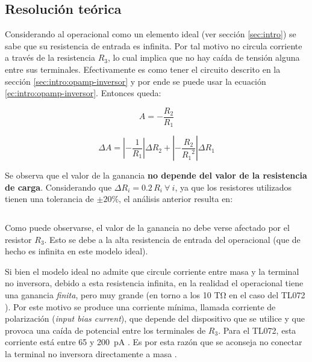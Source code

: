 \subsection{Resolución teórica}
\label{sec:1-teoria}

Considerando al operacional como un elemento ideal (ver sección \ref{sec:intro})
se sabe que su resistencia de entrada es infinita. Por tal motivo no circula
corriente a través de la resistencia $R_3$, lo cual implica que no hay caída
de tensión alguna entre sus terminales. Efectivamente es como tener el circuito
descrito en la sección \ref{sec:intro:opamp-inversor} y por ende se puede usar
la ecuación \ref{ec:intro:opamp-inversor}. Entonces queda:

\begin{equation}
    \label{ec:1-teoria:ganancia}
    A = -\frac{R_2}{R_1}
\end{equation}

\begin{equation}
    \label{ec:1-teoria:err-ganancia}
    \Delta A = \left| - \frac{1}{R_1} \right| \Delta R_2
             + \left| - \frac{R_2}{{R_1}^2} \right| \Delta R_1
\end{equation}

Se observa que el valor de la ganancia \textbf{no depende del valor de la
resistencia de carga}. Considerando que $\Delta R_i = 0.2\,R_i\ \forall\ i$, ya
que los resistores utilizados tienen una tolerancia de $\pm 20\%$, el análisis
anterior resulta en:

\[
    
\]

Como puede observarse, el valor de la ganancia no debe verse afectado por el
resistor $R_3$. Esto se debe a la alta resistencia de entrada del operacional
(que de hecho es infinita en este modelo ideal).

Si bien el modelo ideal no admite que circule corriente entre masa y la
terminal no inversora, debido a esta resistencia infinita, en la realidad
el operacional tiene una ganancia \textit{finita}, pero muy grande (en torno a
los 10 \si{\tera\ohm} en el caso del TL072 \cite[pág. 5]{datasheet-tl072}).
Por este motivo se produce una corriente mínima, llamada corriente de
polarización (\textit{input bias current}), que depende del dispositivo que se
utilice y que provoca una caída de potencial entre los terminales de $R_3$.
Para el TL072, esta corriente está entre 65 y \SI{200}{\pico\ampere} 
\cite[pág. 5]{datasheet-tl072}. Es por esta razón que se aconseja no
conectar la terminal no inversora directamente a masa \cite[pág. 252]{AOE}.
